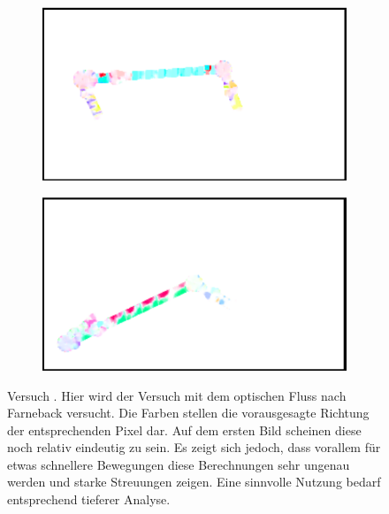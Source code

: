 \begin{figure}
    \centering
    \begin{subfigure}[t]{0.45\textwidth}
        \includegraphics[width=\textwidth]{gfx/farneback_okay.png}
        \label{fig:opticalflow1_okay}
    \end{subfigure}
    \begin{subfigure}[t]{0.45\textwidth}
        \includegraphics[width=\textwidth]{gfx/farneback_bad.png}
        \label{fig:opticalflow1_1_bad}
    \end{subfigure}
    \caption[Versuch ]{Versuch . Hier wird der Versuch mit dem optischen Fluss nach Farneback versucht. Die Farben stellen die vorausgesagte Richtung der entsprechenden Pixel dar. Auf dem ersten Bild scheinen diese noch relativ eindeutig zu sein. Es zeigt sich jedoch, dass vorallem für etwas schnellere Bewegungen diese Berechnungen sehr ungenau werden und starke Streuungen zeigen. Eine sinnvolle Nutzung bedarf entsprechend tieferer Analyse.}\label{fig:opticalflow1_1_bad}
    \label{fig:gruppe_2_1}
\end{figure}

